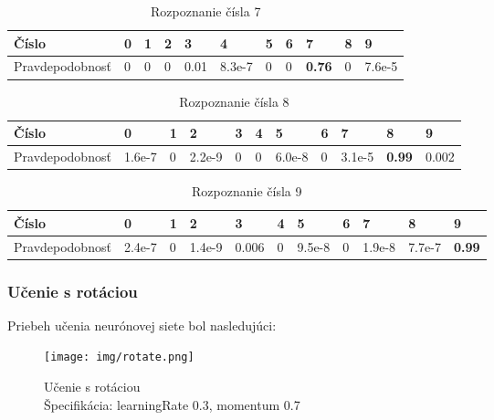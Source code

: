 \begin{table}[H]
  \begin{tabular}{ | l | l | l | l | l | l | l | l | l | l | l |}
    \hline
    Číslo & 0 & 1 & 2 & 3 & 4 & 5 & 6 & 7 & 8 & 9 \\ \hline
    Pravdepodobnosť & 0 & 0 & 0 & 0.01 & 8.3e-7 & 0 & 0 & \textbf{0.76} & 0 & 7.6e-5 \\
    \hline
  \end{tabular}
  \caption[Rozpoznanie čísla 7]{Rozpoznanie čísla 7}
\end{table}

\begin{table}[H]
  \begin{tabular}{ | l | l | l | l | l | l | l | l | l | l | l |}
    \hline
    Číslo & 0 & 1 & 2 & 3 & 4 & 5 & 6 & 7 & 8 & 9 \\ \hline
    Pravdepodobnosť & 1.6e-7 & 0 & 2.2e-9 & 0 & 0 & 6.0e-8 & 0 & 3.1e-5 & \textbf{0.99} & 0.002 \\
    \hline
  \end{tabular}
  \caption[Rozpoznanie čísla 8]{Rozpoznanie čísla 8}
\end{table}

\begin{table}[H]
  \begin{tabular}{ | l | l | l | l | l | l | l | l | l | l | l |}
    \hline
    Číslo & 0 & 1 & 2 & 3 & 4 & 5 & 6 & 7 & 8 & 9 \\ \hline
    Pravdepodobnosť & 2.4e-7 & 0 & 1.4e-9 & 0.006 & 0 & 9.5e-8 & 0 & 1.9e-8 & 7.7e-7 & \textbf{0.99} \\
    \hline
  \end{tabular}
  \caption[Rozpoznanie čísla 9]{Rozpoznanie čísla 9}
\end{table}


\subsubsection{Učenie s rotáciou} %

Priebeh učenia neurónovej siete bol nasledujúci:

\begin{figure}[ht]
    \begin{center}
        \texttt{[image: img/rotate.png]}
        \caption{Učenie s rotáciou\\
        Špecifikácia: learningRate 0.3, momentum 0.7}
    \end{center}
\end{figure}

